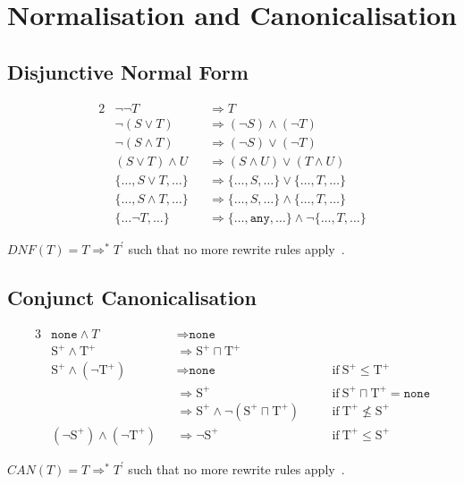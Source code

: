 \documentclass[nonacm,timestamp,manuscript]{acmart}
\newcommand{\atom}[1]{\texttt{#1}}
\newcommand{\type}{\text{T}}
\newcommand{\types}{\text{S}}
\newcommand{\postype}{{\type}^{+}}
\newcommand{\postypes}{{\types}^{+}}
\begin{document}
\section{Normalisation and Canonicalisation}

\newcommand{\rewrite}{\Longrightarrow}

\subsection{Disjunctive Normal Form}

\begin{definition}\label{def:dnf}
\begin{alignat}{2}
  & \neg \neg T && \rewrite T \\
  & \neg (S \lor T) && \rewrite (\neg S) \land (\neg T) \\
  & \neg (S \land T) && \rewrite (\neg S) \lor (\neg T) \\
  & (S \lor T) \land U && \rewrite (S \land U) \lor (T \land U) \\
  & \{ \ldots, S \lor T, \ldots \} && \rewrite \{ \ldots, S, \ldots \} \lor \{ \ldots, T, \ldots \} \\
  & \{ \ldots, S \land T, \ldots \} && \rewrite \{ \ldots, S, \ldots \} \land \{ \ldots, T, \ldots \} \\
  & \{\ldots \neg T, \ldots \} && \rewrite \{ \ldots, \atom{any} , \ldots \} \land \neg \{ \ldots, T, \ldots \}
\end{alignat}

$DNF(T) = T \rewrite^{*} T^{\prime}$ such that no more rewrite rules
apply~\cite{Pearce2013}.
\end{definition}

\subsection{Conjunct Canonicalisation}

\begin{definition}\label{def:can}
  \begin{alignat}{3}
    & \atom{none} \land T && \rewrite \atom{none} \\
    & \postypes \land \postype && \rewrite \postypes \sqcap \postype \\
    & \postypes \land (\neg \postype) && \rewrite \atom{none} && \quad \text{if}\ \postypes \le \postype \\
    &                              && \rewrite \postypes && \quad \text{if}\ \postypes \sqcap \postype = \atom{none} \\
    &                              && \rewrite \postypes \land \neg (\postypes \sqcap \postype) && \quad \text{if}\ \postype \nleq \postypes \\
    & (\neg \postypes) \land (\neg \postype) && \rewrite \neg \postypes && \quad \text{if}\ \postype \le \postypes
\end{alignat}

$CAN(T) = T \rewrite^{*} T^{\prime}$ such that no more rewrite rules
apply~\cite{Pearce2013}.
\end{definition}
\end{document}
